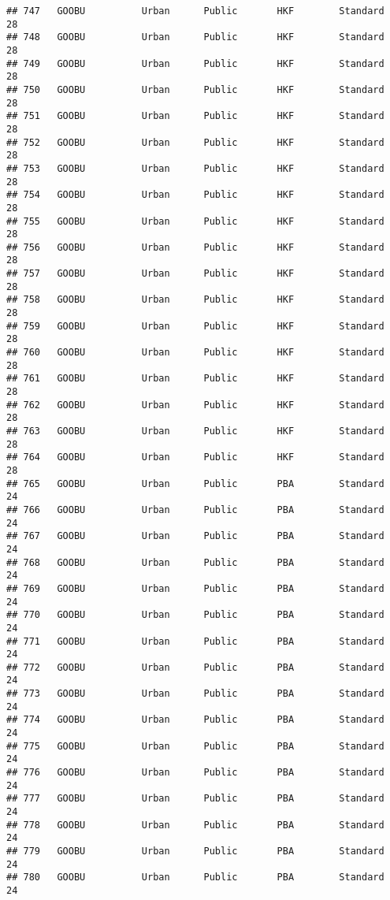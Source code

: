 \documentclass[
]{article}
\begin{document}
\begin{verbatim}
## 747   GOOBU          Urban      Public       HKF        Standard        28
## 748   GOOBU          Urban      Public       HKF        Standard        28
## 749   GOOBU          Urban      Public       HKF        Standard        28
## 750   GOOBU          Urban      Public       HKF        Standard        28
## 751   GOOBU          Urban      Public       HKF        Standard        28
## 752   GOOBU          Urban      Public       HKF        Standard        28
## 753   GOOBU          Urban      Public       HKF        Standard        28
## 754   GOOBU          Urban      Public       HKF        Standard        28
## 755   GOOBU          Urban      Public       HKF        Standard        28
## 756   GOOBU          Urban      Public       HKF        Standard        28
## 757   GOOBU          Urban      Public       HKF        Standard        28
## 758   GOOBU          Urban      Public       HKF        Standard        28
## 759   GOOBU          Urban      Public       HKF        Standard        28
## 760   GOOBU          Urban      Public       HKF        Standard        28
## 761   GOOBU          Urban      Public       HKF        Standard        28
## 762   GOOBU          Urban      Public       HKF        Standard        28
## 763   GOOBU          Urban      Public       HKF        Standard        28
## 764   GOOBU          Urban      Public       HKF        Standard        28
## 765   GOOBU          Urban      Public       PBA        Standard        24
## 766   GOOBU          Urban      Public       PBA        Standard        24
## 767   GOOBU          Urban      Public       PBA        Standard        24
## 768   GOOBU          Urban      Public       PBA        Standard        24
## 769   GOOBU          Urban      Public       PBA        Standard        24
## 770   GOOBU          Urban      Public       PBA        Standard        24
## 771   GOOBU          Urban      Public       PBA        Standard        24
## 772   GOOBU          Urban      Public       PBA        Standard        24
## 773   GOOBU          Urban      Public       PBA        Standard        24
## 774   GOOBU          Urban      Public       PBA        Standard        24
## 775   GOOBU          Urban      Public       PBA        Standard        24
## 776   GOOBU          Urban      Public       PBA        Standard        24
## 777   GOOBU          Urban      Public       PBA        Standard        24
## 778   GOOBU          Urban      Public       PBA        Standard        24
## 779   GOOBU          Urban      Public       PBA        Standard        24
## 780   GOOBU          Urban      Public       PBA        Standard        24

\end{verbatim}
\end{document}
